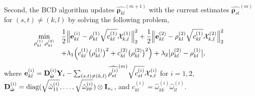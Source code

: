 \documentclass[useAMS,usenatbib,referee]{bio}
\newcommand{\bs}{\boldsymbol}
\begin{document}
{Second, the BCD algorithm updates $\widehat{\bs{\rho}_{kl}}^{(m+1)}$ with the current estimates $\widehat{\bs{\rho}_{st}}^{(m)}$ for $(s,t) \neq (k,l)$ by solving the following problem,
\begin{equation} \label{sub:obj}
\begin{array}{rl}
 \displaystyle  \min_{\rho^{(1)}_{kl},\rho^{(2)}_{kl}} &  \displaystyle 
 \frac{1}{2} \Big\| {\bf e}^{(i)}_{kl} - \rho^{(1)}_{kl} \sqrt{c^{(1)}_{kl}}\mathcal{X}^{(1)}_{k,l} \Big\|_2^2
   +\frac{1}{2} \Big\| {\bf e}^{(2)}_{kl} - \rho^{(2)}_{kl} \sqrt{c^{(1)}_{kl}} \mathcal{X}^{(2)}_{k,l} \Big\|_2^2 \\
&\displaystyle + \lambda_1 \Big(c^{(1)}_{kl}\big(\rho^{(1)}_{kl}\big)^2 +
c^{(2)}_{kl} \big(\rho^{(2)}_{kl}\big)^2 \Big)
  + \lambda_2 \big| \rho^{(2)}_{kl} - \rho^{(1)}_{kl} \big|,
\end{array}
\end{equation}
where $ {\bf e}^{(i)}_{kl} = {\bf D}^{(i)}_{\hat{\bs{\omega}}}\mathbf{Y}_i - \sum_{(s,t) \neq (k,l)} \widehat{\rho^{(i)}_{st}}^{(m)} \sqrt{c^{(i)}_{st}} \mathcal{X}^{(i)}_{s,t}$ for $i=1,2$, ${\bf D}^{(i)}_{\hat{\bs{\omega}}}= {\rm diag}(\sqrt{\hat{\omega}^{(i)}_{11}},\ldots, \sqrt{\hat{\omega}^{(i)}_{pp}})\otimes {\bf I}_{n_i}$, and $c^{(i)}_{kl} = {\hat{\omega}^{(i)}_{kk}\hat{\omega}^{(i)}_{ll}}$.

}
\end{document}
